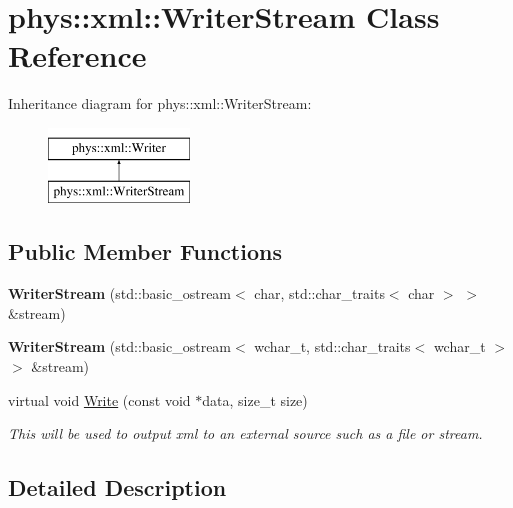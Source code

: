 \hypertarget{classphys_1_1xml_1_1WriterStream}{
\section{phys::xml::WriterStream Class Reference}
\label{d5/d6f/classphys_1_1xml_1_1WriterStream}
}
Inheritance diagram for phys::xml::WriterStream:\begin{figure}[H]
\begin{center}
\leavevmode
\includegraphics[height=2.000000cm]{d5/d6f/classphys_1_1xml_1_1WriterStream}
\end{center}
\end{figure}
\subsection*{Public Member Functions}
\begin{DoxyCompactItemize}
\item 
\hypertarget{classphys_1_1xml_1_1WriterStream_ae170ab7c429b6f7149d3540243329dfa}{
{\bfseries WriterStream} (std::basic\_\-ostream$<$ char, std::char\_\-traits$<$ char $>$ $>$ \&stream)}
\label{d5/d6f/classphys_1_1xml_1_1WriterStream_ae170ab7c429b6f7149d3540243329dfa}

\item 
\hypertarget{classphys_1_1xml_1_1WriterStream_aaebcd545af8e44cf6556a46077f0a366}{
{\bfseries WriterStream} (std::basic\_\-ostream$<$ wchar\_\-t, std::char\_\-traits$<$ wchar\_\-t $>$ $>$ \&stream)}
\label{d5/d6f/classphys_1_1xml_1_1WriterStream_aaebcd545af8e44cf6556a46077f0a366}

\item 
virtual void \hyperlink{classphys_1_1xml_1_1WriterStream_a74242c8abe03f6244d3464a663f75de9}{Write} (const void $\ast$data, size\_\-t size)
\begin{DoxyCompactList}\small\item\em This will be used to output xml to an external source such as a file or stream. \item\end{DoxyCompactList}\end{DoxyCompactItemize}


\subsection{Detailed Description}



